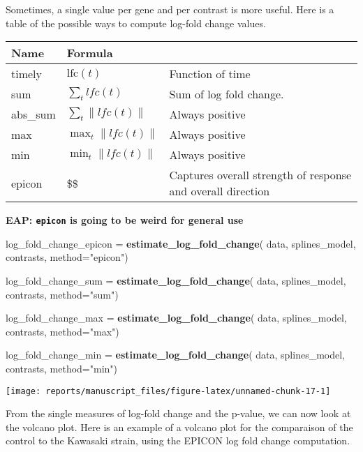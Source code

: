 \documentclass[9pt,a4paper,]{extarticle}
\newenvironment{Shaded}{\begin{snugshade}}{\end{snugshade}}
\newcommand{\DataTypeTok}[1]{\textcolor[rgb]{0.13,0.29,0.53}{#1}}
\newcommand{\KeywordTok}[1]{\textcolor[rgb]{0.13,0.29,0.53}{\textbf{#1}}}
\newcommand{\NormalTok}[1]{#1}
\newcommand{\StringTok}[1]{\textcolor[rgb]{0.31,0.60,0.02}{#1}}
\begin{document}
Sometimes, a single value per gene and per contrast is more useful. Here is a
table of the possible ways to compute log-fold change values.

\begin{longtable}[]{@{}lll@{}}
\toprule
Name & Formula &\tabularnewline
\midrule
\endhead
timely & \(\text{lfc}(t)\) & Function of time\tabularnewline
sum & \(\sum_t lfc(t)\) & Sum of log fold change.\tabularnewline
abs\_sum & \(\sum_t \|lfc(t)\|\) & Always positive\tabularnewline
max & \(\max_t \|lfc(t)\|\) & Always positive\tabularnewline
min & \(\min_t \|lfc(t)\|\) & Always positive\tabularnewline
epicon & \$\$ & Captures overall strength of response and overall direction\tabularnewline
\bottomrule
\end{longtable}

\textbf{EAP: \texttt{epicon} is going to be weird for general use}

\begin{Shaded}
\begin{Highlighting}[]
\NormalTok{log_fold_change_epicon =}\StringTok{ }\KeywordTok{estimate_log_fold_change}\NormalTok{(}
\NormalTok{    data, splines_model, contrasts,  }\DataTypeTok{method=}\StringTok{"epicon"}\NormalTok{)}

\NormalTok{log_fold_change_sum =}\StringTok{ }\KeywordTok{estimate_log_fold_change}\NormalTok{(}
\NormalTok{    data, splines_model, contrasts,  }\DataTypeTok{method=}\StringTok{"sum"}\NormalTok{)}

\NormalTok{log_fold_change_max =}\StringTok{ }\KeywordTok{estimate_log_fold_change}\NormalTok{(}
\NormalTok{    data, splines_model, contrasts, }\DataTypeTok{method=}\StringTok{"max"}\NormalTok{)}

\NormalTok{log_fold_change_min =}\StringTok{ }\KeywordTok{estimate_log_fold_change}\NormalTok{(}
\NormalTok{    data, splines_model, contrasts, }\DataTypeTok{method=}\StringTok{"min"}\NormalTok{)}
\end{Highlighting}
\end{Shaded}

\begin{center}\texttt{[image: reports/manuscript\_files/figure-latex/unnamed-chunk-17-1]} \end{center}

From the single measures of log-fold change and the p-value, we can now look
at the volcano plot. Here is an example of a volcano plot for the comparaison
of the control to the Kawasaki strain, using the EPICON log fold change
computation.
\end{document}
